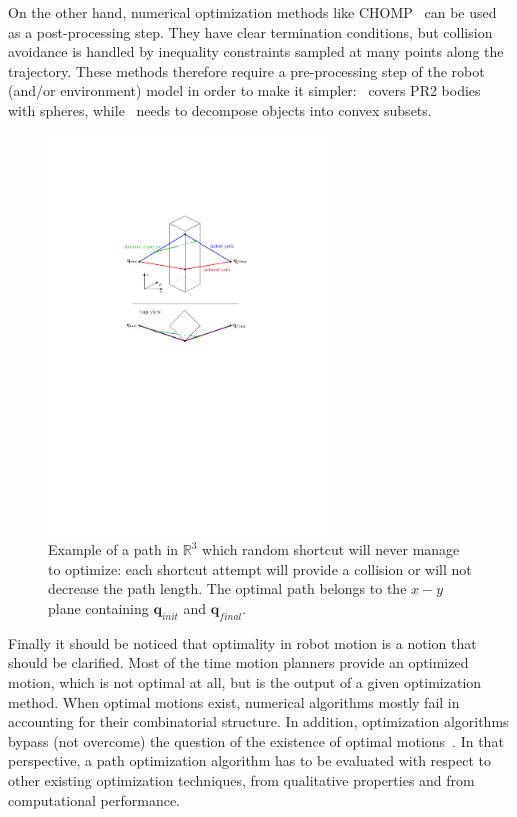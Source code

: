 \documentclass{tADR2e}
\newcommand\real{\mathbb{R}}
\newcommand\conf{\mathbf{q}}
\begin{document}
On the other hand, numerical
optimization methods like CHOMP~\cite{chompIjrr} can be used as a
post-processing step. They have clear termination conditions, but collision
avoidance is handled by inequality constraints sampled at many points along
the trajectory. These methods therefore require a pre-processing step of the
robot (and/or environment) model in order to make 
it simpler:~\cite{chompIjrr} covers PR2 bodies with spheres, 
while~\cite{convexOptimMotplan} needs to decompose objects into convex subsets.

\begin{figure}
	\centering
	\includegraphics[width=7.5cm]{decoupled_DOF_optimization.pdf}
	\caption{Example of a path in $\real^3$ which random shortcut will never manage to 
	optimize: each shortcut attempt will provide a collision or will not 
	decrease the path length. The optimal path belongs to the $x-y$ plane 
	containing $\conf_{init}$ and $\conf_{final}$.}
	\label{decoupled_DOF_optimization}
\end{figure}


Finally it should be noticed that optimality in robot motion is a notion that should be clarified. Most of the 
time motion planners provide an optimized motion, which is not optimal at all, but is the output of a given 
optimization method. When optimal motions exist, numerical
algorithms mostly fail in accounting for their combinatorial structure. In addition, optimization algorithms 
bypass (not overcome) the question of the existence of optimal motions~\cite{LaumondOptim}. In that perspective, 
a path optimization algorithm has to be evaluated with respect to other existing optimization techniques, 
from qualitative properties and from computational performance.
\end{document}
